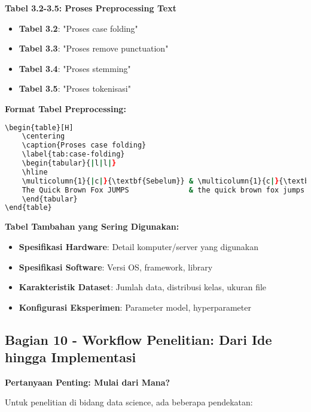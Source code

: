 \textbf{Tabel 3.2-3.5: Proses Preprocessing Text}
\begin{itemize}
    \item \textbf{Tabel 3.2}: "Proses case folding"
    \item \textbf{Tabel 3.3}: "Proses remove punctuation"
    \item \textbf{Tabel 3.4}: "Proses stemming"
    \item \textbf{Tabel 3.5}: "Proses tokenisasi"
\end{itemize}

\textbf{Format Tabel Preprocessing:}
\begin{lstlisting}[language=bash, style=bash, caption=Format Tabel Preprocessing]
\begin{table}[H]
    \centering
    \caption{Proses case folding}
    \label{tab:case-folding}
    \begin{tabular}{|l|l|}
    \hline
    \multicolumn{1}{|c|}{\textbf{Sebelum}} & \multicolumn{1}{c|}{\textbf{Sesudah}} \\ \hline
    The Quick Brown Fox JUMPS              & the quick brown fox jumps             \\ \hline
    \end{tabular}
\end{table}
\end{lstlisting}

\textbf{Tabel Tambahan yang Sering Digunakan:}
\begin{itemize}
    \item \textbf{Spesifikasi Hardware}: Detail komputer/server yang digunakan
    \item \textbf{Spesifikasi Software}: Versi OS, framework, library
    \item \textbf{Karakteristik Dataset}: Jumlah data, distribusi kelas, ukuran file
    \item \textbf{Konfigurasi Eksperimen}: Parameter model, hyperparameter
\end{itemize}

\subsection*{Bagian 10 - Workflow Penelitian: Dari Ide hingga Implementasi}

\textbf{Pertanyaan Penting: Mulai dari Mana?}

Untuk penelitian di bidang data science, ada beberapa pendekatan:


